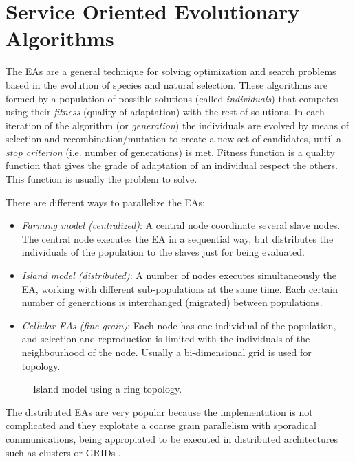 \section{Service Oriented Evolutionary Algorithms}

The EAs are a general technique for solving optimization and search problems based in the evolution of species and natural selection. These algorithms are formed by a population of possible solutions (called {\em individuals}) that competes using their {\em fitness} (quality of adaptation) with the rest of solutions. In each iteration of the algorithm (or {\em generation}) the individuals are evolved by means of selection and recombination/mutation to create a new set of candidates, until a {\em stop criterion} (i.e. number of generations) is met. Fitness function is a quality function that gives the grade of adaptation of an individual respect the others. This function is usually the problem to solve.

There are different ways to parallelize the EAs:

\begin{itemize}
\item {\em Farming model (centralized)}: A central node coordinate several slave nodes. The central node executes the EA in a sequential way, but distributes the individuals of the population to the slaves just for being evaluated.
\item {\em Island model (distributed)}: A number of nodes executes simultaneously the EA, working with different sub-populations at the same time. Each certain number of generations is interchanged (migrated) between populations.
\item {\em Cellular EAs (fine grain)}: Each node has one individual of the population, and selection and reproduction is limited with the individuals of the neighbourhood of the node. Usually a bi-dimensional grid is used for topology.
\end{itemize}

\begin{figure}
\centering
{}
\caption{Island model using a ring topology.}
\label{fig:timeMMDP}
\end{figure}


The distributed EAs are very popular because the implementation is not complicated and they explotate a coarse grain parallelism with sporadical communications, being appropiated to be executed in distributed architectures such as clusters or GRIDs \cite{}.


